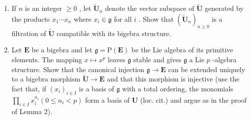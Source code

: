 \begin{enumerate}
\def\labelenumi{(\alph{enumi})}
\setcounter{enumi}{1}
\item
  If \(n\) is an integer \(\geqslant 0\) , let \(\tilde{\mathbf{U}}_n\) denote the vector subspace of \(\tilde{\mathbf{U}}\) generated by the products \(x_1\cdots x_n\) where \(x_i \in \mathfrak{g}\) for all \(i\) . Show that \((\tilde{\mathbf{U}}_n)_{n \geqslant 0}\) is a filtration of \(\tilde{\mathbf{U}}\) compatible with its bigebra structure.
\item
  Let \(\mathbf{E}\) be a bigebra and let \(\mathfrak{g} = \mathrm{P}(\mathbf{E})\) be the Lie algebra of its primitive elements. The mapping \(x\mapsto x^p\) leaves \(\mathfrak{g}\) stable and gives \(\mathfrak{g}\) a Lie \(p\) -algebra structure. Show that the canonical injection \(\mathfrak{g}\to \mathbf{E}\) can be extended uniquely to a bigebra morphism \(\tilde{\mathbf{U}}\rightarrow \mathbf{E}\) and that this morphism is injective (use the fact that, if \((x_{i})_{i\in I}\) is a basis of \(\mathfrak{g}\) with a total ordering, the monomials \(\prod_{i\in I}x_i^{n_i}(0\leqslant n_i < p)\) form a basis of \(\mathbf{U}\) (loc. cit.) and argue as in the proof of Lemma 2).
\end{enumerate}
